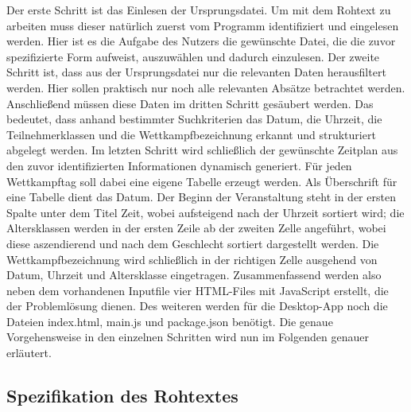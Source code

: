 {Der erste Schritt ist das Einlesen der Ursprungsdatei. Um mit dem Rohtext zu arbeiten muss dieser natürlich zuerst vom Programm identifiziert und eingelesen werden. Hier ist es die Aufgabe des Nutzers die gewünschte Datei, die die zuvor spezifizierte Form aufweist, auszuwählen und dadurch einzulesen. Der zweite Schritt ist, dass aus der Ursprungsdatei nur die relevanten Daten herausfiltert werden. Hier sollen praktisch nur noch alle relevanten Absätze betrachtet werden. Anschließend müssen diese Daten im dritten Schritt gesäubert werden. Das bedeutet, dass anhand bestimmter Suchkriterien das Datum, die Uhrzeit, die Teilnehmerklassen und die Wettkampfbezeichnung erkannt und strukturiert abgelegt werden. Im letzten Schritt wird schließlich der gewünschte Zeitplan aus den zuvor identifizierten Informationen dynamisch generiert. Für jeden Wettkampftag soll dabei eine eigene Tabelle erzeugt werden. Als Überschrift für eine Tabelle dient das Datum. Der Beginn der Veranstaltung steht in der ersten Spalte unter dem Titel Zeit, wobei aufsteigend nach der Uhrzeit sortiert wird; die Altersklassen werden in der ersten Zeile ab der zweiten Zelle angeführt, wobei diese aszendierend und nach dem Geschlecht sortiert dargestellt werden. Die Wettkampfbezeichnung wird schließlich in der richtigen Zelle ausgehend von Datum, Uhrzeit und Altersklasse eingetragen. 
Zusammenfassend werden also neben dem vorhandenen Inputfile vier HTML-Files mit JavaScript erstellt, die der Problemlösung dienen. Des weiteren werden für die Desktop-App noch die Dateien index.html, main.js und package.json benötigt. Die genaue Vorgehensweise in den einzelnen Schritten wird nun im Folgenden genauer erläutert.

\subsection{Spezifikation des Rohtextes}

}
